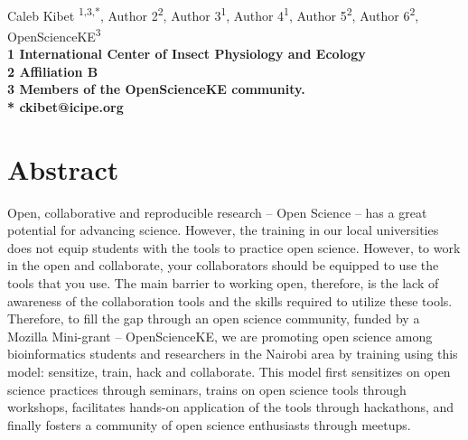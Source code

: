 \documentclass[10pt,letterpaper]{article}
\begin{document}
\vspace*{0.35in}

\begin{flushleft}
{\Large
\textbf{}
}
\newline
\\
Caleb Kibet \textsuperscript{1,3,*},
Author 2\textsuperscript{2},
Author 3\textsuperscript{1},
Author 4\textsuperscript{1},
Author 5\textsuperscript{2},
Author 6\textsuperscript{2},
OpenScienceKE\textsuperscript{3}
\\
\bigskip
\bf{1} International Center of Insect Physiology and Ecology
\\
\bf{2} Affiliation B
\\
\bf{3} Members of the OpenScienceKE community.
\\
\bigskip
* ckibet@icipe.org

\end{flushleft}

\section*{Abstract}

Open, collaborative and reproducible research – Open Science – has a great potential for advancing science. However, the training in our local universities does not equip students with the tools to practice open science. However, to work in the open and collaborate, your collaborators should be equipped to use the tools that you use. The main barrier to working open, therefore, is the lack of awareness of the collaboration tools and the skills required to utilize these tools. Therefore, to fill the gap through an open science community, funded by a Mozilla Mini-grant – OpenScienceKE, we are promoting open science among bioinformatics students and researchers in the Nairobi area by training using this model: sensitize, train, hack and collaborate. This model first sensitizes on open science practices through seminars, trains on open science tools through workshops, facilitates hands-on application of the tools through hackathons, and finally fosters a community of open science enthusiasts through meetups. 
\end{document}
